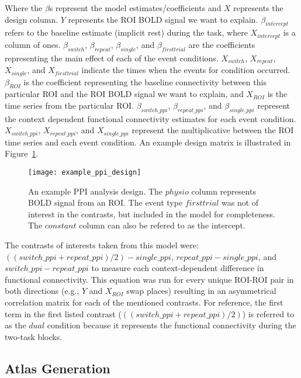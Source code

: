 \documentclass[phd,appendix,figures]{uithesis}
\begin{document}
Where the $\beta$s represent the model estimates/coefficients and $X$ represents
the design column.
$Y$ represents the ROI BOLD signal we want to explain.
$\beta_{intercept}$ refers to the baseline estimate (implicit rest) during the task,
where $X_{intercept}$ is a column of ones.
$\beta_{switch}$, $\beta_{repeat}$, $\beta_{single}$, and $\beta_{firsttrial}$
are the coefficients representing the main effect of each of the event conditions.
$X_{switch}$, $X_{repeat}$, $X_{single}$, and $X_{firsttrial}$ indicate the
times when the events for condition occurred.
$\beta_{ROI}$ is the coefficient representing the baseline connectivity between
this particular ROI and the ROI BOLD signal we want to explain, and
$X_{ROI}$ is the time series from the particular ROI.
$\beta_{switch\_ppi}$, $\beta_{repeat\_ppi}$, and $\beta_{single\_ppi}$
represent the context dependent functional connectivity estimates for
each event condition.
$X_{switch\_ppi}$, $X_{repeat\_ppi}$, and $X_{single\_ppi}$ represent
the multiplicative between the ROI time series and each event condition.
An example design matrix is illustrated in Figure~\ref{fig:example_ppi_design}.

\begin{figure}[H]
  \centering
  \texttt{[image: example\_ppi\_design]}
  \caption[An example PPI analysis design]{
    An example PPI analysis design.
    The $physio$ column represents BOLD signal from an ROI.
    The event type $firsttrial$ was not of interest in the contrasts,
    but included in the model for completeness.
    The $constant$ column can also be refered to as the intercept.
  }
  \label{fig:example_ppi_design}
\end{figure}

The contrasts of interests taken from this model were:\\
$((switch\_ppi + repeat\_ppi) / 2) - single\_ppi$, $repeat\_ppi - single\_ppi$,
and $switch\_ppi - repeat\_ppi$ to measure each context-dependent difference in functional connectivity. 
This equation was run for every unique ROI-ROI pair in both directions
(e.g., $Y$ and $X_{ROI}$ swap places) resulting in an
asymmetrical correlation matrix for each of the mentioned contrasts.
For reference, the first term in the first listed contrast ($((switch\_ppi + repeat\_ppi) / 2)$)
is referred to as the $dual$ condition because it represents the functional connectivity during the
two-task blocks.

\subsection*{Atlas Generation}
\label{methods:atlas-corr-analysis2}
\end{document}
